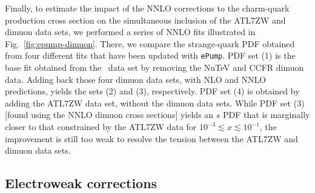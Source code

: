 Finally, to estimate the impact of the NNLO corrections to the charm-quark production cross section on the simultaneous inclusion of the ATL7ZW and dimuon data sets,
we performed a series of NNLO fits illustrated in Fig.~\ref{fig:epump-dimuon}. There, we compare the strange-quark PDF obtained 
from four different fits that have been updated with \texttt{ePump}. PDF set (1)
is the base fit obtained from the \CTHERAII~data set by removing
the NuTeV and CCFR dimuon data. 
Adding back those four dimuon data sets, with NLO and NNLO predictions, yields the sets (2) and (3), respectively. PDF set (4) is obtained 
by adding the ATL7ZW data set, without the dimuon data sets. 
While PDF set (3) [found using the NNLO dimuon cross sections] yields an $s$ PDF that is marginally closer to
that constrained by the  ATL7ZW data for $10^{-3}\! \lesssim\! x\! \lesssim\! 10^{-1}$,  the improvement is still too weak to resolve the tension between the 
ATL7ZW and dimuon data sets.

\subsection{Electroweak corrections}
\label{sec:EW}

